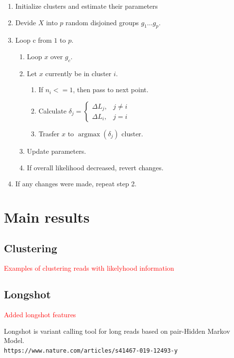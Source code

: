 \documentclass[a4paper, 12pt]{article}
\DeclareMathOperator{\argmax}{argmax}
\theoremstyle{definition}
\theoremstyle{definition}
\theoremstyle{remark}
\newcommand\myworries[1]{\textcolor{red}{#1}}
\begin{document}
\begin{enumerate}
    \item Initialize clusters and estimate their parameters
    \item Devide $X$ into $p$ random disjoined groups $g_1 \ldots g_p$.
    \item Loop c from $1$ to $p$.
    \begin{enumerate}
        \item Loop $x$ over $g_c$.
        \item Let $x$ currently be in cluster $i$.
        \begin{enumerate}
            \item If $n_i <= 1$, then pass to next point.
            \item Calculate $\delta_{j}=
                \left\{\begin{array}{cc}
                \Delta L_{j}, & j \neq i \\
                \Delta L_{i}, & j=i
                \end{array}\right. $
            \item Trasfer $x$ to $\argmax (\delta_j)$ cluster.
        \end{enumerate} 
        \item Update parameters.
        \item If overall likelihood decreased, revert changes.
    \end{enumerate}
    \item If any changes were made, repeat step 2.
\end{enumerate}

\section{Main results}
\subsection{Clustering}
\myworries{Examples of clustering reads with likelyhood information}
\subsection{Longshot}
\myworries{Added longshot features}

\newpage
\begin{thebibliography}{00}
    Longshot is variant calling tool for long reads based on pair-Hidden Markov Model.
    \\\texttt{https://www.nature.com/articles/s41467-019-12493-y}
\end{thebibliography}
\end{document}
